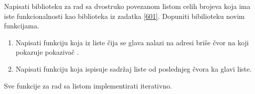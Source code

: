 \begin{Exercise}[label=603]
Napisati biblioteku za rad sa dvostruko povezanom listom celih brojeva koja ima iste funkcionalnosti kao biblioteka iz zadatka \ref{601}. 
Dopuniti bibilioteku novim funkcijama.
\begin{enumerate}
 \item Napisati funkciju  koja iz liste čija se glava nalazi na adresi  briše čvor na koji pokazuje pokazivač .
 \item Napisati funkciju  koja ispisuje sadržaj liste od poslednjeg čvora ka glavi liste.
\end{enumerate}

Sve funkcije za rad sa listom implementirati iterativno.
\end{Exercise}
\begin{Answer}[ref=603]
\end{Answer}


